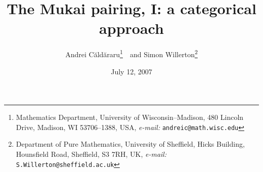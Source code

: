 
\author{%
Andrei C\u ald\u araru\thanks{Mathematics Department,
University of Wisconsin--Madison, 480 Lincoln Drive, Madison, WI
53706--1388, USA, {\em e-mail: }{\tt andreic@math.wisc.edu}}\ \  and Simon
Willerton\thanks{Department of Pure Mathematics, University of Sheffield,
Hicks Building, Hounsfield Road, Sheffield, S3 7RH, UK, {\em e-mail:
}{\tt S.Willerton@sheffield.ac.uk}}}

\title{The Mukai pairing, I: a categorical approach}

\date{July 12, 2007}